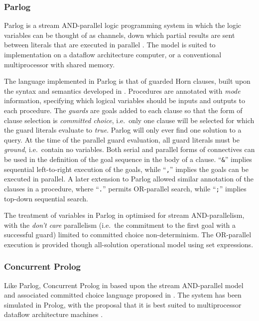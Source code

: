 \subsubsection{Parlog}


Parlog is a stream AND-parallel logic programming system in which the logic
variables can be thought of as channels, down which partial results are sent between
literals that are executed in parallel \cite{CG84}.  The model is suited to
implementation on a dataflow architecture computer, or a conventional multiprocessor
with shared memory.

The language implemented in Parlog is that of guarded Horn clauses, built upon the
syntax and semantics developed in \cite{CG81}.  Procedures are annotated with \textit{mode}
information, specifying which logical variables should be inputs and outputs to each
procedure. The \textit{guards} are goals added to each clause so that the form of
clause selection is \textit{committed choice}, i.e.\ only one clause will be selected for
which the guard literals evaluate to \textit{true}.  Parlog will only ever find one
solution to a query.
At the time of the parallel guard evaluation, all guard literals must be
\textit{ground}, i.e.\ contain no variables.  Both serial and parallel forms
of connectives can be used in the definition of the goal sequence in the body of 
a clause. ``\texttt{\&}'' implies sequential left-to-right execution of the goals, while
``\texttt{,}'' implies the goals can be executed in parallel.  A later extension to
Parlog allowed similar annotation of the clauses in a procedure, where ``\texttt{.}'' 
permits OR-parallel search, while ``\texttt{;}'' implies top-down sequential search.

The treatment of variables in Parlog in optimised for stream AND-parallelism, with
the \textit{don't care} parallelism (i.e.\ the commitment to the first goal with a
successful guard) limited to committed choice non-determinism.  The OR-parallel
execution is provided though all-solution operational model using set expressions.

\subsubsection{Concurrent Prolog}


Like Parlog, Concurrent Prolog in based upon the stream AND-parallel model and
associated committed choice language proposed in \cite{CG81}.  The system has
been simulated in Prolog, with the proposal that it is best suited to multiprocessor
dataflow architecture machines \cite{Sha87a}.

